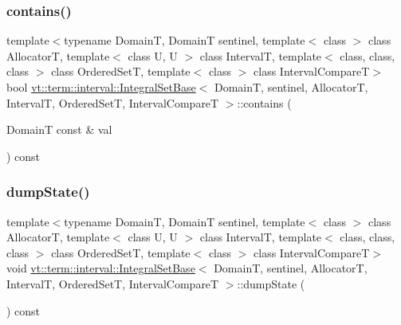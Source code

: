 \subsubsection{\texorpdfstring{contains()}{contains()}}
{\footnotesize\ttfamily template$<$typename DomainT, DomainT sentinel, template$<$ class $>$ class AllocatorT, template$<$ class U, U $>$ class IntervalT, template$<$ class, class, class $>$ class Ordered\+SetT, template$<$ class $>$ class Interval\+CompareT$>$ \\
bool \hyperlink{structvt_1_1term_1_1interval_1_1_integral_set_base}{vt\+::term\+::interval\+::\+Integral\+Set\+Base}$<$ DomainT, sentinel, AllocatorT, IntervalT, Ordered\+SetT, Interval\+CompareT $>$\+::contains (\begin{DoxyParamCaption}\item[{DomainT const \&}]{val }\end{DoxyParamCaption}) const\hspace{0.3cm}{\ttfamily [inline]}}

\mbox{\label{structvt_1_1term_1_1interval_1_1_integral_set_base_a1af9b94870159b8796053112c31f9570}} 
\subsubsection{\texorpdfstring{dump\+State()}{dumpState()}}
{\footnotesize\ttfamily template$<$typename DomainT, DomainT sentinel, template$<$ class $>$ class AllocatorT, template$<$ class U, U $>$ class IntervalT, template$<$ class, class, class $>$ class Ordered\+SetT, template$<$ class $>$ class Interval\+CompareT$>$ \\
void \hyperlink{structvt_1_1term_1_1interval_1_1_integral_set_base}{vt\+::term\+::interval\+::\+Integral\+Set\+Base}$<$ DomainT, sentinel, AllocatorT, IntervalT, Ordered\+SetT, Interval\+CompareT $>$\+::dump\+State (\begin{DoxyParamCaption}{ }\end{DoxyParamCaption}) const\hspace{0.3cm}{\ttfamily [inline]}}

\mbox{\label{structvt_1_1term_1_1interval_1_1_integral_set_base_aaf1b42550ad04b45edf7bb0b120a3ea5}} 
